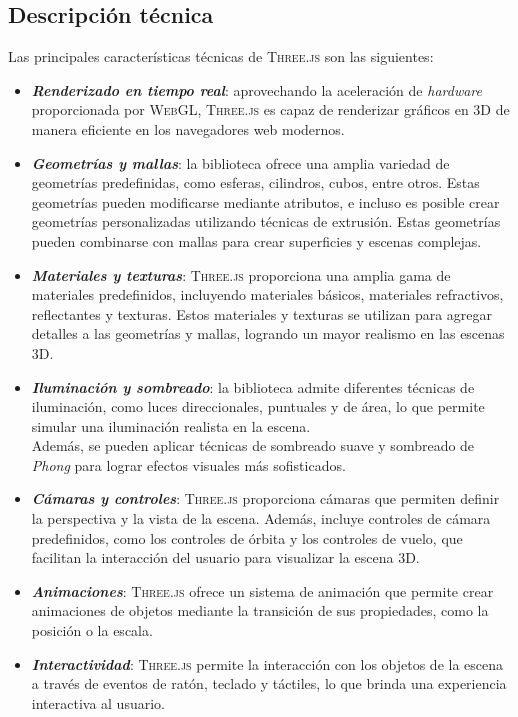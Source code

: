 \documentclass[a4paper, 11pt]{book}
\begin{document}
\subsection{Descripción técnica}
Las principales características técnicas de \textsc{Three.js} son las siguientes:
\begin{itemize}
\item \textbf{\emph{Renderizado en tiempo real}}: aprovechando la aceleración de \emph{hardware} proporcionada por \textsc{WebGL}, \textsc{Three.js} es capaz de renderizar gráficos en \textsc{3D} de manera eficiente en los navegadores web modernos.
\item \textbf{\emph{Geometrías y mallas}}: la biblioteca ofrece una amplia variedad de geometrías predefinidas, como esferas, cilindros, cubos, entre otros. Estas geometrías pueden modificarse mediante atributos, e incluso es posible crear geometrías personalizadas utilizando técnicas de extrusión. Estas geometrías pueden combinarse con mallas para crear superficies y escenas complejas.
\item \textbf{\emph{Materiales y texturas}}: \textsc{Three.js} proporciona una amplia gama de materiales predefinidos, incluyendo materiales básicos, materiales refractivos, reflectantes y texturas. Estos materiales y texturas se utilizan para agregar detalles a las geometrías y mallas, logrando un mayor realismo en las escenas \textsc{3D}.
\item \textbf{\emph{Iluminación y sombreado}}: la biblioteca admite diferentes técnicas de iluminación, como luces direccionales, puntuales y de área, lo que permite simular una iluminación realista en la escena. \\
Además, se pueden aplicar técnicas de sombreado suave y sombreado de \emph{Phong} para lograr efectos visuales más sofisticados.
\item \textbf{\emph{Cámaras y controles}}: \textsc{Three.js} proporciona cámaras que permiten definir la perspectiva y la vista de la escena. Además, incluye controles de cámara predefinidos, como los controles de órbita y los controles de vuelo, que facilitan la interacción del usuario para visualizar la escena \textsc{3D}.
\item \textbf{\emph{Animaciones}}: \textsc{Three.js} ofrece un sistema de animación que permite crear animaciones de objetos mediante la transición de sus propiedades, como la posición o la escala.
\item \textbf{\emph{Interactividad}}: \textsc{Three.js} permite la interacción con los objetos de la escena a través de eventos de ratón, teclado y táctiles, lo que brinda una experiencia interactiva al usuario.
\end{itemize}
\end{document}
